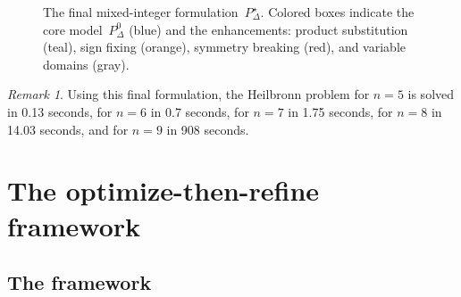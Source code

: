\documentclass[11pt,a4paper]{article}
\theoremstyle{plain}
\theoremstyle{definition}
\theoremstyle{remark}
\newtheorem{remark}{Remark}
\begin{document}
\begin{figure}[h]
    
    \caption{The final mixed-integer formulation~$P_\Delta^\star$. Colored boxes indicate the core model~$P_\Delta^0$ (blue) and the enhancements: product substitution (teal), sign fixing (orange), symmetry breaking (red), and variable domains (gray).}
    \label{fig:final-model}
    \end{figure}

  \begin{remark}
    Using this final formulation, the Heilbronn problem for $n=5$ is solved in 0.13 seconds,
    for $n=6$ in 0.7 seconds, for $n=7$ in 1.75 seconds, for $n=8$ in 14.03 seconds, and for 
    $n=9$ in 908 seconds.  \end{remark}
  

  \section{The optimize-then-refine framework}\label{sec:framework}

  \subsection{The framework}
\end{document}
